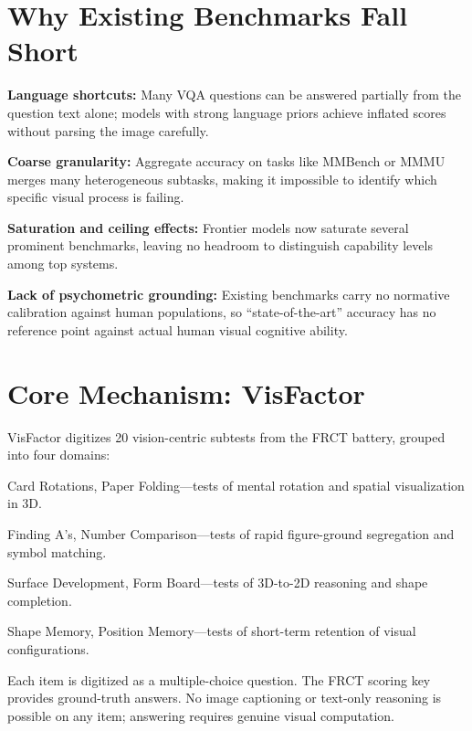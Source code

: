 \documentclass[10pt,twocolumn]{article}
\begin{document}
\section{Why Existing Benchmarks Fall Short}

\textbf{Language shortcuts:}
Many VQA questions can be answered partially from the question text alone;
models with strong language priors achieve inflated scores without parsing
the image carefully.

\textbf{Coarse granularity:}
Aggregate accuracy on tasks like MMBench or MMMU merges many heterogeneous
subtasks, making it impossible to identify which specific visual process is
failing.

\textbf{Saturation and ceiling effects:}
Frontier models now saturate several prominent benchmarks, leaving no
headroom to distinguish capability levels among top systems.

\textbf{Lack of psychometric grounding:}
Existing benchmarks carry no normative calibration against human populations,
so ``state-of-the-art'' accuracy has no reference point against actual human
visual cognitive ability.

\section{Core Mechanism: VisFactor}

VisFactor digitizes 20 vision-centric subtests from the FRCT battery, grouped
into four domains:

\begin{description}[leftmargin=0pt,labelsep=6pt,itemsep=2pt,parsep=0pt,
    font=\small\bfseries]
  \item[Spatial Reasoning:] Card Rotations, Paper Folding---tests of mental
    rotation and spatial visualization in 3D.
  \item[Perceptual Speed:] Finding A's, Number Comparison---tests of rapid
    figure-ground segregation and symbol matching.
  \item[Visualization:] Surface Development, Form Board---tests of 3D-to-2D
    reasoning and shape completion.
  \item[Visual Memory:] Shape Memory, Position Memory---tests of short-term
    retention of visual configurations.
\end{description}

Each item is digitized as a multiple-choice question. The FRCT scoring key
provides ground-truth answers. No image captioning or text-only reasoning
is possible on any item; answering requires genuine visual computation.
\end{document}
